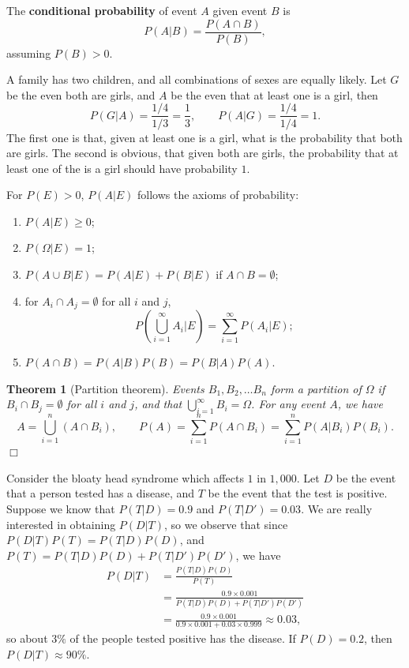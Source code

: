 \documentclass[letter-paper]{tufte-book}
\newtheorem{theorem}{\color{pastel-blue}Theorem}[section]
\newenvironment{example}[1][Example]{\begin{trivlist}
\item[\hskip \labelsep {\bfseries #1}]}{\end{trivlist}}
\newcommand\Def[1]{\textbf{#1}}
\newcommand{\qedwhite}{\hfill \ensuremath{\Box}}
\begin{document}
The \Def{conditional probability} of event $A$ given event $B$ is
\begin{equation*}
  P(A|B)=\frac{P(A\cap B)}{P(B)},
\end{equation*}
assuming $P(B)>0$.
\begin{example}
  A family has two children, and all combinations of sexes are equally likely.
  Let $G$ be the even both are girls, and $A$ be the even that at least one is a
  girl, then
  \begin{equation*}
    P(G|A)=\frac{1/4}{1/3}=\frac{1}{3},\qquad
    P(A|G)=\frac{1/4}{1/4}=1.
  \end{equation*}
  The first one is that, given at least one is a girl, what is the probability
  that both are girls. The second is obvious, that given both are girls, the
  probability that at least one of the is a girl should have probability $1$.
\end{example}

For $P(E)>0$, $P(A|E)$ follows the axioms of probability:
\begin{enumerate}
  \item $P(A|E)\geq0$;
  \item $P(\Omega|E)=1$;
  \item $P(A\cup B|E)=P(A|E)+P(B|E)$ if $A\cap B=\emptyset$;
  \item for $A_i\cap A_j=\emptyset$ for all $i$ and $j$,
  \begin{equation*}
    P\left(\bigcup_{i=1}^\infty A_i|E\right)=\sum_{i=1}^\infty P(A_i|E);
  \end{equation*}
  \item $P(A\cap B)=P(A|B)P(B)=P(B|A)P(A)$.
\end{enumerate}

\begin{theorem}[Partition theorem]
  Events $B_1, B_2,\ldots B_n$ form a partition of $\Omega$ if $B_i\cap
  B_j=\emptyset$ for all $i$ and $j$, and that $\bigcup_{i=1}^\infty
  B_i=\Omega$. For any event $A$, we have
  \begin{equation*}
    A=\bigcup_{i=1}^n(A\cap B_i),\qquad P(A)=\sum_{i=1}^n P(A\cap B_i)=
    \sum_{i=1}^n P(A|B_i)P(B_i).
  \end{equation*}
  \qedwhite
\end{theorem}
\begin{example}
  Consider the bloaty head syndrome which affects $1$ in $1,000$. Let $D$ be the
  event that a person tested has a disease, and $T$ be the event that the test
  is positive. Suppose we know that $P(T|D)=0.9$ and $P(T|D')=0.03$. We are
  really interested in obtaining $P(D|T)$, so we observe that since
  $P(D|T)P(T)=P(T|D)P(D)$, and $P(T)=P(T|D)P(D)+P(T|D')P(D')$, we have
  \begin{align*}
    P(D|T)&=\frac{P(T|D)P(D)}{P(T)}\\
    &=\frac{0.9\times0.001}{P(T|D)P(D)+P(T|D')P(D')}\\
    &=\frac{0.9\times0.001}{0.9\times0.001+0.03\times0.999} \approx 0.03,
  \end{align*}
  so about $3\%$ of the people tested positive has the disease. If $P(D)=0.2$,
  then $P(D|T)\approx90\%$.
\end{example}
\end{document}
